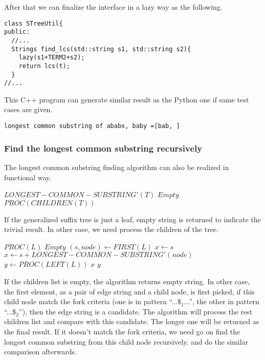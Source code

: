 \documentclass{article}
\begin{document}
After that we can finalize the interface in a lazy way as the following.

\begin{lstlisting}
class STreeUtil{
public:
  //...
  Strings find_lcs(std::string s1, std::string s2){
    lazy(s1+TERM2+s2);
    return lcs(t);
  }
//...
\end{lstlisting}

This C++ program can generate similar result as the Python one if same
test cases are given.

\begin{verbatim}
longest common substring of ababx, baby =[bab, ]
\end{verbatim}

\subsubsection{Find the longest common substring recursively}
The longest common substring finding algorithm can also be
realized in functional way.

\begin{algorithmic}
\STATE $LONGEST-COMMON-SUBSTRING'(T)$
    \RETURN $Empty$
  \ELSE
    \RETURN $PROC(CHILDREN(T))$
  \ENDIF
\end{algorithmic}

If the generalized suffix tree is just a leaf, empty string is
returned to indicate the trivial result. In other case, we
need process the children of the tree.

\begin{algorithmic}
\STATE $PROC(L)$
    \RETURN $Empty$
  \ELSE
    \STATE $(s, node) \leftarrow FIRST(L)$
      \STATE $x \leftarrow s$
    \ELSE
      \STATE $x \leftarrow s + LONGEST-COMMON-SUBSTRING'(node)$
    \ENDIF
    \STATE $y \leftarrow PROC(LEFT(L))$
      \RETURN $x$
    \ELSE
      \RETURN $y$
    \ENDIF
  \ENDIF
\end{algorithmic}

If the children list is empty, the algorithm returns empty 
string. In other case, the first element, as a pair of edge
string and a child node, is first picked, if this child node
match the fork criteria (one is in pattern ``...$\$_1$...'',
the other in pattern ``...$\$_2$''), then the edge string is
a candidate. The algorithm will process the rest children 
list and compare with this candidate. The longer one will 
be returned as the final result.
If it doesn't match the fork criteria, we need go on find the
longest common substring from this child node recursively.
and do the similar comparison afterwards.
\end{document}
